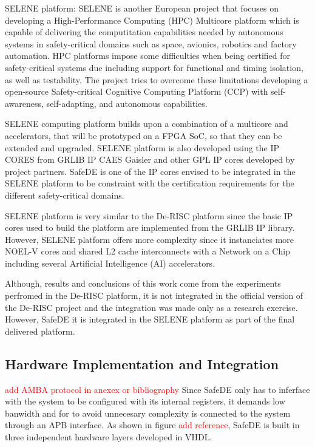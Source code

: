 SELENE platform: SELENE is another European project that focuses on developing a High-Performance Computing (HPC) Multicore platform which is capable of delivering the computitation capabilities needed by autonomous systems in safety-critical domains such as space, avionics, robotics and factory automation. HPC platforms impose some difficulties when being certified for safety-critical systems due including support for functional and timing isolation, as well as testability. The project tries to overcome these limitations developing a open-source Safety-critical Cognitive Computing
Platform (CCP) with self-awareness, self-adapting, and autonomous capabilities. 

SELENE computing platform builds upon a combination of a multicore and accelerators, that will be prototyped on a FPGA SoC, so that they can be extended and upgraded. SELENE platform is also developed using the IP CORES from GRLIB IP CAES Gaisler and other GPL IP cores developed by project partners. SafeDE is one of the IP cores envised to be integrated in the SELENE platform to be constraint with the certification requirements for the different safety-critical domains.  

SELENE platform is very similar to the De-RISC platform since the basic IP cores used to build the platform are implemented from the GRLIB IP library. However, SELENE platform offers more complexity since it instanciates more NOEL-V cores and shared L2 cache interconnects with a Network on a Chip including several Artificial Intelligence (AI) accelerators.

Although, results and conclusions of this work come from the experiments perfromed in the De-RISC platform, it is not integrated in the official version of the De-RISC project and the integration was made only as a research exercise. However, SafeDE it is integrated in the SELENE platform as part of the final delivered platform.

\subsection{Hardware Implementation and Integration}

\textcolor{red}{add AMBA protocol in anexex or bibliography}
Since SafeDE only has to inferface with the system to be configured with its internal registers, it demands low banwidth and for to avoid unnecesary complexity is connected to the system through an APB interface. As shown in figure \textcolor{red}{add reference}, SafeDE is built in three independent hardware layers developed in VHDL. 

